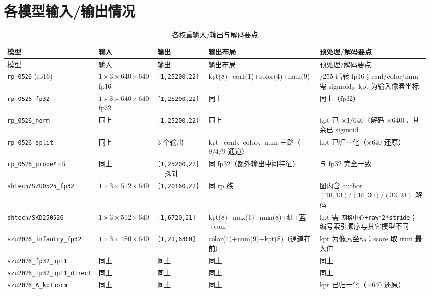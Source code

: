 \documentclass[11pt,a4paper]{ctexart}
\newcommand{\code}[1]{\texttt{\small #1}}
\begin{document}
\section{各模型输入/输出情况}
{\footnotesize\setlength{\tabcolsep}{3pt}
\begin{longtable}{@{}p{4.2cm} p{2.2cm} p{2.0cm} p{3.6cm} p{3.9cm}@{}}
\caption{各权重输入/输出与解码要点}\\
\toprule
模型 & 输入 & 输出 & 输出布局 & 预处理/解码要点 \\
\midrule
\endfirsthead
\toprule
模型 & 输入 & 输出 & 输出布局 & 预处理/解码要点 \\
\midrule
\endhead
\bottomrule
\endfoot
\code{rp\_0526} (fp16) & $1\times3\times640\times640$ fp16 & \code{[1,25200,22]} &
kpt(8)+conf(1)+color(4)+num(9) & $/255$ 后转 fp16；conf/color/num 需 sigmoid，kpt 为输入像素坐标 \\
\code{rp\_0526\_fp32} & $1\times3\times640\times640$ fp32 & \code{[1,25200,22]} & 同上 & 同上（fp32）\\
\code{rp\_0526\_norm} & 同上 & \code{[1,25200,22]} & 同上 & kpt 已 $\times1/640$（解码 $\times640$），其余已 sigmoid \\
\code{rp\_0526\_split} & 同上 & 3 个输出 &
kpt+conf、color、num 三路（$9/4/9$ 通道） & kpt 已归一化（$\times640$ 还原）\\
\code{rp\_0526\_probe*}$\times5$ & 同上 & \code{[1,25200,22]} + 探针 & 同 fp32（额外输出中间特征） & 与 fp32 完全一致 \\
\code{shtech/SZU0526\_fp32} & $1\times3\times512\times640$ & \code{[1,20160,22]} & 同 rp 族 &
图内含 anchor $(10,13)/(16,30)/(33,23)$ 解码 \\
\code{shtech/SKD250526} & $1\times3\times512\times640$ & \code{[1,6720,21]} &
kpt(8)+max(1)+num(8)+红+蓝+conf & kpt 需 \code{网格中心+raw*2*stride}；编号索引顺序与其它模型不同 \\
\code{szu2026\_infantry\_fp32} & $1\times3\times480\times640$ & \code{[1,21,6300]} &
color(4)+num(9)+kpt(8)（通道在前） & kpt 为像素坐标；score 取 num 最大值 \\
\code{szu2026\_fp32\_op11} & 同上 & 同上 & 同上 & 同上 \\
\code{szu2026\_fp32\_op11\_direct} & 同上 & 同上 & 同上 & 同上 \\
\code{szu2026\_A\_kptnorm} & 同上 & 同上 & 同上 & kpt 已归一化（$\times640$ 还原）\\

\end{longtable}}
\end{document}

